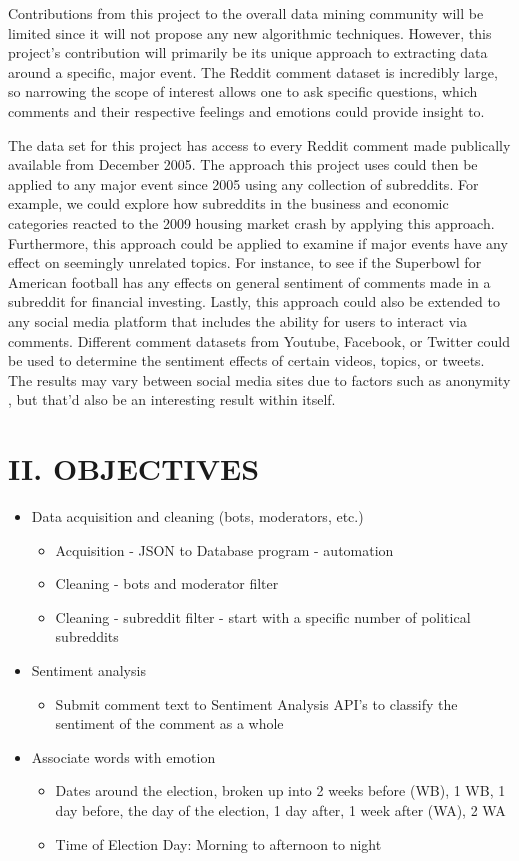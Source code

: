 \documentclass[letterpaper]{article}
\begin{document}
Contributions from this project to the overall data mining community will be limited since it will not propose any new algorithmic techniques. However, this project’s contribution will primarily be its unique approach to extracting data around a specific, major event. The Reddit comment dataset is incredibly large, so narrowing the scope of interest allows one to ask specific questions, which comments and their respective feelings and emotions could provide insight to.

The data set for this project has access to every Reddit comment made publically available from December 2005. The approach this project uses could then be applied to any major event since 2005 using any collection of subreddits. For example, we could explore how subreddits in the business and economic categories reacted to the 2009 housing market crash by applying this approach. Furthermore, this approach could be applied to examine if major events have any effect on seemingly unrelated topics. For instance, to see if the Superbowl for American football has any effects on general sentiment of comments made in a subreddit for financial investing. Lastly, this approach could also be extended to any social media platform that includes the ability for users to interact via comments. Different comment datasets from Youtube, Facebook, or Twitter could be used to determine the sentiment effects of certain videos, topics, or tweets. The results may vary between social media sites due to factors such as anonymity , but that’d also be an interesting result within itself.


\section{II. OBJECTIVES}
\begin{itemize}
    \item Data acquisition and cleaning (bots, moderators, etc.)
    \begin{itemize}
        \item Acquisition - JSON to Database program - automation
        \item Cleaning - bots and moderator filter
        \item Cleaning - subreddit filter - start with a specific number of political subreddits
    \end{itemize}
    \item Sentiment analysis
    \begin{itemize}
        \item Submit comment text to Sentiment Analysis API’s to classify the sentiment of the comment as a whole
    \end{itemize}
    \item Associate words with emotion
    \begin{itemize}
        \item Dates around the election, broken up into 2 weeks before (WB), 1 WB, 1 day before, the day of the election, 1 day after, 1 week after (WA), 2 WA
        \item Time of Election Day: Morning to afternoon to night
    \end{itemize}
\end{itemize}
\end{document}
